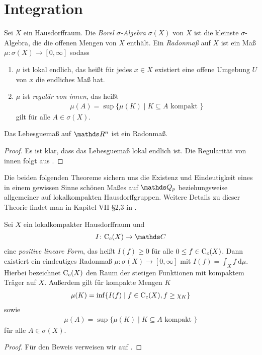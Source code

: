 \chapter{Integration}
\begin{defi}
Sei $X$ ein Hausdorffraum. Die \emph{Borel $\sigma$-Algebra} $\sigma(X)$ von $X$ ist die kleinste $\sigma$-Algebra, die die offenen Mengen von $X$ enthält.
Ein \emph{Radonmaß} auf $X$ ist ein Maß $\mu \colon \sigma(X) \to [0,\infty]$ sodass
\begin{enumerate}[label=\roman*)]
\item $\mu$ ist lokal endlich, das heißt für jedes $x\in X$ existiert eine offene Umgebung $U$ von $x$ die endliches Maß hat.
\item $\mu$ ist \emph{regulär von innen}, das heißt
\begin{align*}
\mu(A)=\sup\{\mu(K)\mid K\subseteq A \text{ kompakt }\}
\end{align*}
gilt für alle $A \in \sigma(X)$.
\end{enumerate}
\end{defi}

\begin{bsp}
Das Lebesguemaß auf $\Rn$ ist ein Radonmaß.
\end{bsp}
\begin{proof}
Es ist klar, dass das Lebesguemaß lokal endlich ist.
Die Regularität von innen folgt aus \cite[II, 7.2]{Elstrodt}.
\end{proof}

Die beiden folgenden Theoreme sichern uns die Existenz und Eindeutigkeit eines in einem gewissen Sinne schönen Maßes auf $\Q_p$ beziehungsweise allgemeiner auf lokalkompakten Hausdorffgruppen.
Weitere Details zu dieser Theorie findet man in Kapitel VII \S 2,3 in \cite{Elstrodt}.

\begin{thm}[Riesz]
Sei $X$ ein lokalkompakter Hausdorffraum und
\begin{align*}
I \colon \CC_c(X) \to \C
\end{align*}
eine \emph{positive lineare Form}, das heißt $I(f)\geq 0$ für alle $0\leq f \in \mathrm{C}_c(X)$.
Dann existiert ein eindeutiges Radonmaß $\mu \colon \sigma(X)\to [0,\infty]$ mit $I(f)=\int_X f ~\mathrm{d}\mu$.
Hierbei bezeichnet $\mathrm{C}_c(X)$ den Raum der stetigen Funktionen mit kompaktem Träger auf $X$.
Außerdem gilt für kompakte Mengen $K$
\begin{align*}
\mu(K)=\inf\{I(f)\mid f\in \mathrm{C}_c(X),f \geq \chi_K\}
\end{align*}
sowie
\begin{align*}
\mu(A)=\sup\{\mu(K)\mid K\subseteq A \text{ kompakt }\}
\end{align*}
für alle $A \in \sigma(X)$.
\end{thm}
\begin{proof}
Für den Beweis verweisen wir auf \cite[VII, 2.5]{Elstrodt}.
\end{proof}

